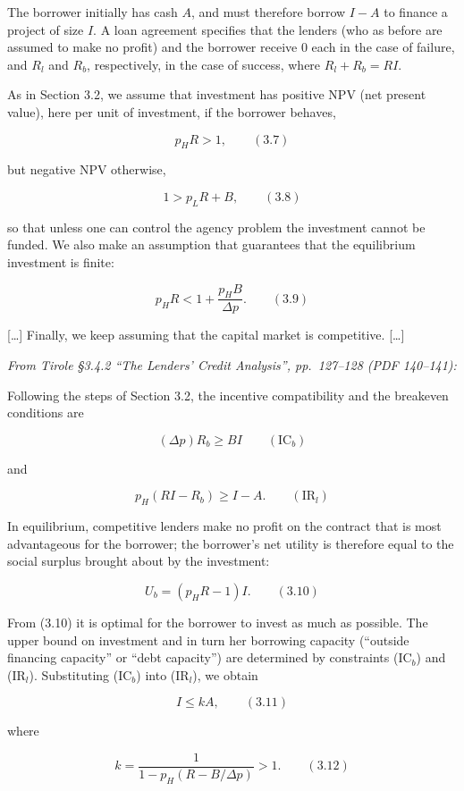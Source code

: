 \documentclass[11pt,a4paper]{article}
\begin{document}
The borrower initially has cash \(A\), and must therefore borrow \(I - A\) to finance a project of
size \(I\). A loan agreement specifies that the lenders (who as before are assumed to make no
profit) and the borrower receive 0 each in the case of failure, and \(R_l\) and \(R_b\),
respectively, in the case of success, where \(R_l + R_b = RI\).

As in Section 3.2, we assume that investment has positive NPV (net present value), here per unit of
investment, if the borrower behaves,

\[p_H R > 1, \qquad (3.7)\]

but negative NPV otherwise,

\[1 > p_L R + B, \qquad (3.8)\]

so that unless one can control the agency problem the investment cannot be funded. We also make an
assumption that guarantees that the equilibrium investment is finite:

\[p_H R < 1 + \frac{p_H B}{\Delta p}. \qquad (3.9)\]

{[}\ldots{]} Finally, we keep assuming that the capital market is competitive. {[}\ldots{]}

\emph{From Tirole §3.4.2 ``The Lenders' Credit Analysis'', pp.~127--128 (PDF 140--141):}

Following the steps of Section 3.2, the incentive compatibility and the breakeven conditions are

\[(\Delta p) R_b \geqslant BI \qquad (\text{IC}_b)\]

and

\[p_H(RI - R_b) \geqslant I - A. \qquad (\text{IR}_l)\]

In equilibrium, competitive lenders make no profit on the contract that is most advantageous for the
borrower; the borrower's net utility is therefore equal to the social surplus brought about by the
investment:

\[U_b = (p_H R - 1) I. \qquad (3.10)\]

From (3.10) it is optimal for the borrower to invest as much as possible. The upper bound on
investment and in turn her borrowing capacity (``outside financing capacity'' or ``debt capacity'')
are determined by constraints (IC\(_b\)) and (IR\(_l\)). Substituting (IC\(_b\)) into (IR\(_l\)), we
obtain

\[I \leqslant kA, \qquad (3.11)\]

where

\[k = \frac{1}{1 - p_H(R - B/\Delta p)} > 1. \qquad (3.12)\]
\end{document}
